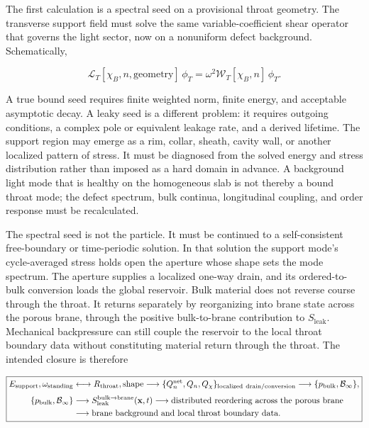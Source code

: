 The first calculation is a spectral seed on a provisional throat geometry. The
transverse support field must solve the same variable-coefficient shear operator
that governs the light sector, now on a nonuniform defect background. Schematically,

\[
\mathcal L_T[\chi_B,n,\text{geometry}]\,\phi_T
=
\omega^2\mathcal W_T[\chi_B,n] \,\phi_T.
\]

A true bound seed requires finite weighted norm, finite energy, and acceptable
asymptotic decay. A leaky seed is a different problem: it requires outgoing
conditions, a complex pole or equivalent leakage rate, and a derived lifetime.
The support region may emerge as a rim, collar, sheath, cavity wall, or another
localized pattern of stress. It must be diagnosed from the solved energy and
stress distribution rather than imposed as a hard domain in advance. A
background light mode that is healthy on the homogeneous slab is not thereby a
bound throat mode; the defect spectrum, bulk continua, longitudinal coupling,
and order response must be recalculated.

The spectral seed is not the particle. It must be continued to a
self-consistent free-boundary or time-periodic solution. In that solution the
support mode's cycle-averaged stress holds open the aperture whose shape sets the
mode spectrum. The aperture supplies a localized one-way drain, and its
ordered-to-bulk conversion loads the global reservoir. Bulk material does not
reverse course through the throat. It returns separately by reorganizing into
brane state across the porous brane, through the positive bulk-to-brane
contribution to \(S_{\mathrm{leak}}\). Mechanical backpressure can still couple
the reservoir to the local throat boundary data without constituting material
return through the throat. The intended closure is therefore

\[
\boxed{
\begin{aligned}
E_{\rm support},\omega_{\rm standing}
&\longleftrightarrow R_{\rm throat},\text{shape}
\longrightarrow
\{Q_n^{\rm net},Q_n,Q_\chi\}_{\rm localized\ drain/conversion}
\longrightarrow
\{p_{\rm bulk},\mathcal B_\infty\},
\\[0.3em]
\{p_{\rm bulk},\mathcal B_\infty\}
&\longrightarrow
S_{\mathrm{leak}}^{\mathrm{bulk}\to\mathrm{brane}}(\mathbf x,t)
\longrightarrow
\text{distributed reordering across the porous brane}
\\
&\longrightarrow
\text{brane background and local throat boundary data}.
\end{aligned}
}
\]

